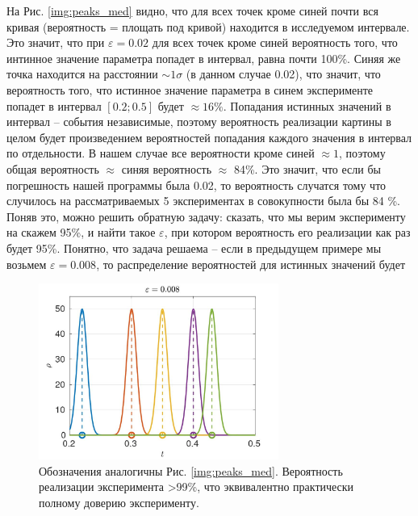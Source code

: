\documentclass[a4paper,12pt]{article} %
\begin{document}
На Рис. \ref{img:peaks_med} видно, что для всех точек кроме синей почти вся кривая (вероятность = площать под кривой) находится в исследуемом интервале. Это значит, что при $\varepsilon = 0.02$ для всех точек кроме синей вероятность того, что интинное значение параметра попадет в интервал, равна почти 100\%. Синяя же точка находится на расстоянии $\sim 1 \sigma$ (в данном случае 0.02), что значит, что вероятность того, что истинное значение параметра в синем эксперименте попадет в интервал $[0.2; 0.5]$ будет $\approx 16 \%$. Попадания истинных значений в интервал -- события независимые, поэтому вероятность реализации картины в целом будет произведением вероятностей попадания каждого значения в интервал по отдельности. В нашем случае все вероятности кроме синей $\approx 1$, поэтому общая вероятность $\approx$ синяя вероятность $\approx$ 84\%. Это значит, что если бы погрешность нашей программы была 0.02, то вероятность случатся тому что случилось на рассматриваемых 5 экспериментах в совокупности была бы 84 \%. Поняв это, можно решить обратную задачу: сказать, что мы верим эксперименту на скажем 95\%, и найти такое $\varepsilon$, при котором вероятность его реализации как раз будет 95\%. Понятно, что задача решаема -- если в предыдущем примере мы возьмем $\varepsilon = 0.008$, то распределение вероятностей для истинных значений будет 

\begin{figure}[h!]
\begin{center}
\includegraphics[width=0.7\textwidth]{./pics/peaks_sharp_med}
\end{center}
\caption{Обозначения аналогичны Рис. \ref{img:peaks_med}. Вероятность реализации эксперимента >99\%, что эквивалентно практически полному доверию эксперименту.} \label{img:peaks_sharp_med}
\end{figure}

\newpage
\end{document}
